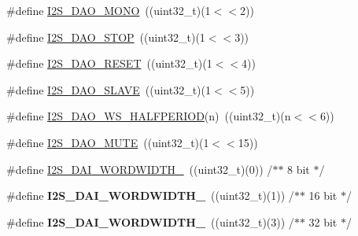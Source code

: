 \begin{DoxyCompactItemize}
\item 
\#define \hyperlink{group___i2_s___private___macros_gab32b25d6de6c9c964421ff08c1402e03}{\-I2\-S\-\_\-\-D\-A\-O\-\_\-\-M\-O\-N\-O}~((uint32\-\_\-t)(1$<$$<$2))
\item 
\#define \hyperlink{group___i2_s___private___macros_gaa8e56c2dab6e3206093dd6575332253d}{\-I2\-S\-\_\-\-D\-A\-O\-\_\-\-S\-T\-O\-P}~((uint32\-\_\-t)(1$<$$<$3))
\item 
\#define \hyperlink{group___i2_s___private___macros_ga7ec4a63719a45df4d30f42e03af0d9e6}{\-I2\-S\-\_\-\-D\-A\-O\-\_\-\-R\-E\-S\-E\-T}~((uint32\-\_\-t)(1$<$$<$4))
\item 
\#define \hyperlink{group___i2_s___private___macros_ga58ea023dda649de724684288e703ef86}{\-I2\-S\-\_\-\-D\-A\-O\-\_\-\-S\-L\-A\-V\-E}~((uint32\-\_\-t)(1$<$$<$5))
\item 
\#define \hyperlink{group___i2_s___private___macros_ga3bfda0af914736d2765822daee28a489}{\-I2\-S\-\_\-\-D\-A\-O\-\_\-\-W\-S\-\_\-\-H\-A\-L\-F\-P\-E\-R\-I\-O\-D}(n)~((uint32\-\_\-t)(n$<$$<$6))
\item 
\#define \hyperlink{group___i2_s___private___macros_ga78bd42c0693e2a68dcba79a4cc05b8d5}{\-I2\-S\-\_\-\-D\-A\-O\-\_\-\-M\-U\-T\-E}~((uint32\-\_\-t)(1$<$$<$15))
\item 
\#define \hyperlink{group___i2_s___private___macros_ga8bd50ada05c4cd981f07be7a3b1002dc}{\-I2\-S\-\_\-\-D\-A\-I\-\_\-\-W\-O\-R\-D\-W\-I\-D\-T\-H\-\_}~((uint32\-\_\-t)(0))		/$\ast$$\ast$ 8 bit	$\ast$/
\item 
\hypertarget{group___i2_s___private___macros_ga26e60492415a246afde8d4ede5aa292e}{\#define {\bfseries \-I2\-S\-\_\-\-D\-A\-I\-\_\-\-W\-O\-R\-D\-W\-I\-D\-T\-H\-\_}~((uint32\-\_\-t)(1))		/$\ast$$\ast$ 16 bit	$\ast$/}\label{group___i2_s___private___macros_ga26e60492415a246afde8d4ede5aa292e}

\item 
\hypertarget{group___i2_s___private___macros_ga576561248aa7e6f27c5ef6c51def80ed}{\#define {\bfseries \-I2\-S\-\_\-\-D\-A\-I\-\_\-\-W\-O\-R\-D\-W\-I\-D\-T\-H\-\_}~((uint32\-\_\-t)(3))		/$\ast$$\ast$ 32 bit	$\ast$/}\label{group___i2_s___private___macros_ga576561248aa7e6f27c5ef6c51def80ed}


\end{DoxyCompactItemize}

